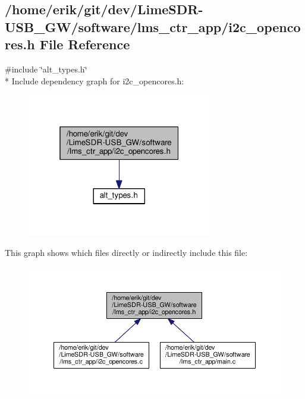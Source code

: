 \subsection{/home/erik/git/dev/\+Lime\+S\+D\+R-\/\+U\+S\+B\+\_\+\+G\+W/software/lms\+\_\+ctr\+\_\+app/i2c\+\_\+opencores.h File Reference}
\label{software_2lms__ctr__app_2i2c__opencores_8h}
{\ttfamily \#include \char`\"{}alt\+\_\+types.\+h\char`\"{}}\\*
Include dependency graph for i2c\+\_\+opencores.\+h\+:
\nopagebreak
\begin{figure}[H]
\begin{center}
\leavevmode
\includegraphics[width=229pt]{d5/d5a/software_2lms__ctr__app_2i2c__opencores_8h__incl}
\end{center}
\end{figure}
This graph shows which files directly or indirectly include this file\+:
\nopagebreak
\begin{figure}[H]
\begin{center}
\leavevmode
\includegraphics[width=350pt]{d4/d6e/software_2lms__ctr__app_2i2c__opencores_8h__dep__incl}
\end{center}
\end{figure}
